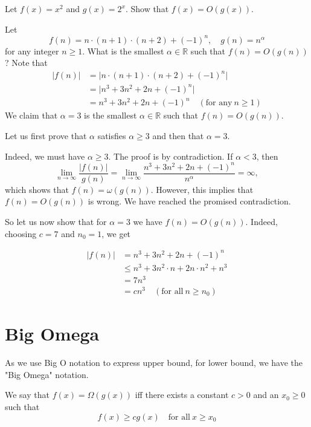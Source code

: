 \begin{exercise}
    Let \(f(x) = x^2\) and \(g(x) = 2^x\). Show that \(f(x) = O(g(x))\).
\end{exercise}

\begin{eg}
    Let
    \[
        f(n) = n \cdot (n + 1) \cdot (n + 2) + (-1)^n, \quad g(n) = n^\alpha 
    \]
    for any integer \(n \geq 1\). What is the smallest \(\alpha \in \mathbb{R}\) such that \(f(n) = O(g(n))\)?
    Note that
    \[
        \begin{aligned}
            \vert f(n) \vert &= \vert n \cdot (n + 1) \cdot (n + 2) + (-1)^n \vert \\
            &= \vert n^3 + 3n^2 + 2n + (-1)^n \vert \\
            &= n^3 + 3n^2 + 2n + (-1)^n\quad (\text{for any}\ n \geq 1)
        \end{aligned}
    \] 
    We claim that \(\alpha = 3\) is the smallest \(\alpha \in \mathbb{R}\) such that \(f(n) = O(g(n))\).

    Let us first prove that \(\alpha\) satisfies \(\alpha \geq 3\) and then that \(\alpha = 3\). 

    Indeed, we must have \(\alpha \geq 3\). The proof is by contradiction. If \(\alpha < 3\), then
    \[
        \lim_{n \to \infty} \dfrac{\vert f(n) \vert }{g(n)} = \lim_{n \to \infty} \dfrac{n^3 + 3n^2 + 2n + (-1)^n}{n^\alpha} = \infty,
    \]
    which shows that \(f(n) = \omega (g(n))\). However, this implies that \(f(n) = O(g(n))\) is wrong. We have reached the promised contradiction.

    So let us now show that for \(\alpha = 3\) we have \(f(n) = O(g(n))\). Indeed, choosing \(c = 7\) and \(n_0 = 1\), we get 

    \[
        \begin{aligned}
            \vert f(n) \vert &= n^3 + 3n^2 + 2n + (-1)^n \\
            &\leq n^3 + 3n^2 \cdot n + 2n \cdot n^2 + n^3 \\
            &= 7n^3 \\
            &= cn^3 \quad (\text{for all}\ n \geq n_0)
        \end{aligned}
    \] 
\end{eg}


\section{Big Omega}
As we use Big O notation to express upper bound, for lower bound, we have the "Big Omega" notation.
\begin{definition}
    We say that \(f(x) = \Omega(g(x))\) iff there exists a constant \(c > 0\) and an \(x_0 \geq 0\) such that
    \[
    f(x) \geq cg(x)\quad\text{for all}\ x \geq x_0
    \]
\end{definition}

